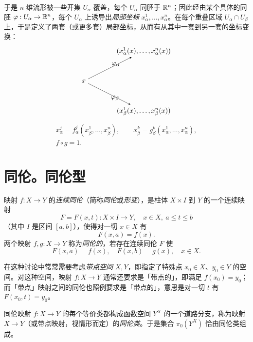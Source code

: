 于是 $n$ 维流形被一些开集 $U_\alpha$ 覆盖，每个 $U_\alpha$ 同胚于 $\mathbb{R}^n$；因此经由某个具体的同胚 $\varphi:U_\alpha\to\mathbb{R}^n$，每个 $U_\alpha$ 上诱导出\emph{局部坐标} $x_\alpha^1,\dots,x_\alpha^n$。在每个重叠区域 $U_\alpha\cap U_\beta$ 上，于是定义了两套（或更多套）局部坐标，从而有从其中一套到另一套的坐标变换：
\[
\begin{tikzpicture}[>=stealth,baseline=(x.base)]
  \node (x) at (0,0) {$x$};
  \node (xa) at (3.1,1.55) {$(x_\alpha^1(x),\dots,x_\alpha^n(x))$};
  \node (xb) at (3.1,-1.55) {$(x_\beta^1(x),\dots,x_\beta^n(x))$};
  \draw[->] (x) -- node[above right=-1pt] {$\varphi_\alpha$} (xa);
  \draw[->] (x) -- node[below right=-1pt] {$\varphi_\beta$} (xb);
\end{tikzpicture}
\]
\begin{equation}
  \begin{gathered}
    x_\alpha^j=f_\alpha^j(x_\beta^1,\dots,x_\beta^n),\qquad
    x_\beta^k=g_\beta^k(x_\alpha^1,\dots,x_\alpha^n),\\
    f\circ g=1.
  \end{gathered}
  \tag{1.3}
\end{equation}

\section{同伦。同伦型}


映射 $f:X\to Y$ 的\emph{连续同伦}（简称\emph{同伦}或\emph{形变}），是柱体 $X\times I$ 到 $Y$ 的一个连续映射
\[
  F=F(x,t):X\times I\to Y,\quad x\in X,\ a\le t\le b
\]
（其中 $I$ 是区间 $[a,b]$），使得对一切 $x\in X$ 有
\[
  F(x,a)=f(x).
\]
两个映射 $f,g:X\to Y$ 称为\emph{同伦的}，若存在连续同伦 $F$ 使
\[
  F(x,a)=f(x),\quad F(x,b)=g(x),\quad x\in X.
\]

在这种讨论中常常需要考虑\emph{带点空间} $X,Y$，即指定了特殊点 $x_0\in X$、$y_0\in Y$ 的空间。对这种空间，映射 $f:X\to Y$ 通常还要求是「带点的」，即满足 $f(x_0)=y_0$；而「带点」映射之间的同伦也照例要求是「带点的」，意思是对一切 $t$ 有 $F(x_0,t)=y_0$。

同伦映射 $f:X\to Y$ 的每个等价类都构成函数空间 $Y^X$ 的一个道路分支，称为映射 $X\to Y$（或带点映射，视情形而定）的\emph{同伦类}。于是集合 $\pi_0(Y^X)$ 恰由同伦类组成。

